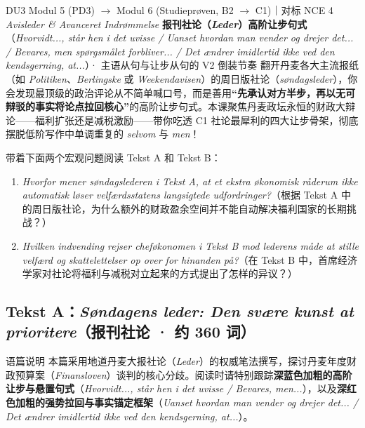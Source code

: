 {DU3 Modul 5 (PD3) $\rightarrow$ Modul 6 (Studieprøven, B2 $\rightarrow$ C1)｜对标 NCE 4 \textit{Avisleder \& Avanceret Indrømmelse}}
{\textbf{报刊社论（\textit{Leder}）高阶让步句式}（\textit{Hvorvidt..., står hen i det uvisse / Uanset hvordan man vender og drejer det... / Bevares, men spørgsmålet forbliver... / Det ændrer imidlertid ikke ved den kendsgerning, at...}）· 主语从句与让步从句的 V2 倒装节奏}
{翻开丹麦各大主流报纸（如 \textit{Politiken}、\textit{Berlingske} 或 \textit{Weekendavisen}）的周日版社论（\textit{søndagsleder}），你会发现最顶级的政治评论从不简单喊口号，而是善用\textbf{“先承认对方半步，再以无可辩驳的事实将论点拉回核心”}的高阶让步句式。本课聚焦丹麦政坛永恒的财政大辩论——福利扩张还是减税激励——带你吃透 C1 社论最犀利的四大让步骨架，彻底摆脱低阶写作中单调重复的 \textit{selvom} 与 \textit{men}！}

\begin{foerduleaeser}
带着下面两个宏观问题阅读 Tekst A 和 Tekst B：
\begin{enumerate}
  \item \textit{Hvorfor mener søndagslederen i Tekst A, at et ekstra økonomisk råderum ikke automatisk løser velfærdsstatens langsigtede udfordringer?}（根据 Tekst A 中的周日版社论，为什么额外的财政盈余空间并不能自动解决福利国家的长期挑战？）
  \item \textit{Hvilken indvending rejser cheføkonomen i Tekst B mod lederens måde at stille velfærd og skattelettelser op over for hinanden på?}（在 Tekst B 中，首席经济学家对社论将福利与减税对立起来的方式提出了怎样的异议？）
\end{enumerate}
\end{foerduleaeser}


\subsection*{Tekst A：\textit{Søndagens leder: Den svære kunst at prioritere}（报刊社论 · 约 360 词）}

\begin{tipbox}{语篇说明}
本篇采用地道丹麦大报社论（\textit{Leder}）的权威笔法撰写，探讨丹麦年度财政预算案（\textit{Finansloven}）谈判的核心分歧。阅读时请特别跟踪\textbf{\color{NCDNavy}深蓝色加粗的高阶让步与悬置句式}（\textit{Hvorvidt..., står hen i det uvisse / Bevares, men...}），以及\textbf{\color{NCDRed}深红色加粗的强势拉回与事实锚定框架}（\textit{Uanset hvordan man vender og drejer det... / Det ændrer imidlertid ikke ved den kendsgerning, at...}）。
\end{tipbox}

